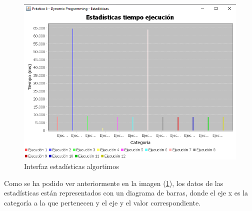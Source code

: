 \begin{figure}[!h]
    \centering
    \includegraphics[width=\linewidth]{MVC/View/img/stats-algt.png}
    \caption{Interfaz estadísticas algortimos}
    \label{fig:Ejemplo stats Algt}
\end{figure}

Como se ha podido ver anteriormente en la imagen (\ref{fig:Ejemplo stats Algt}), los datos de las estadísticas están representados con un diagrama de barras, donde el eje x es la categoría a la que pertenecen y el eje y el valor correspondiente.
